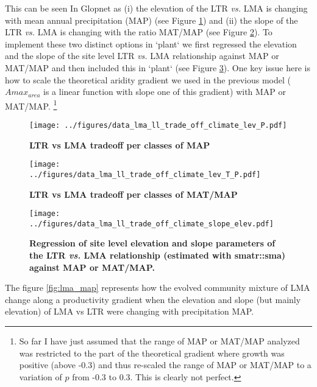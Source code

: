 \documentclass[a4paper,11pt]{article}
\begin{document}
This can be seen In Glopnet as (i) the elevation of the LTR \textit{vs.} LMA is changing with mean annual precipitation (MAP) (see Figure \ref{fig:MAP}) and (ii) the slope of the LTR \textit{vs.} LMA is changing with the ratio MAT/MAP (see Figure \ref{fig:MAT_MAP}). To implement these two distinct options in `plant` we first regressed the elevation and the slope of the site level LTR \textit{vs.} LMA relationship against MAP or MAT/MAP and then included this in `plant` (see Figure \ref{fig:elev_slope}). One key issue here is how to scale the theoretical aridity gradient we used in the previous model ($A{max}_{area}$ is a linear function with slope one of this gradient) with MAP or MAT/MAP. \footnote{So far I have just assumed that the range of MAP or MAT/MAP analyzed was restricted to the part of the theoretical gradient where growth was positive (above -0.3) and thus re-scaled the range of MAP or MAT/MAP to a variation of $p$ from -0.3 to 0.3. This is clearly not perfect.}

\begin{figure}[ht]
\centering
\texttt{[image: ../figures/data\_lma\_ll\_trade\_off\_climate\_lev\_P.pdf]}
\caption{\textbf{LTR vs LMA tradeoff per classes of MAP}
\label{fig:MAP}}
\end{figure}


\begin{figure}[ht]
\centering
\texttt{[image: ../figures/data\_lma\_ll\_trade\_off\_climate\_lev\_T\_P.pdf]}
\caption{\textbf{LTR vs LMA tradeoff per classes of MAT/MAP}
\label{fig:MAT_MAP}}
\end{figure}


\begin{figure}[ht]
\centering
\texttt{[image: ../figures/data\_lma\_ll\_trade\_off\_climate\_slope\_elev.pdf]}
\caption{\textbf{Regression of site level elevation and slope parameters of the LTR \textit{vs.} LMA relationship (estimated with smatr::sma) against MAP or MAT/MAP. }
\label{fig:elev_slope}}
\end{figure}




The figure \ref{fig:lma_map} represents how the evolved community
mixture of LMA change along a productivity gradient when the elevation
and slope (but mainly elevation) of LMA vs LTR were changing with
precipitation MAP.
\end{document}
